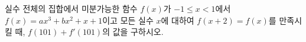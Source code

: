 실수 전체의 집합에서 미분가능한 함수 $f(x)$가 $-1\le x<1$에서 $f(x)=ax^3+bx^2+x+1$이고 모든 실수 $x$에 대하여 $f(x+2)=f(x)$를 만족시킬 때, $f(101)+f'(101)$의 값을 구하시오. 
